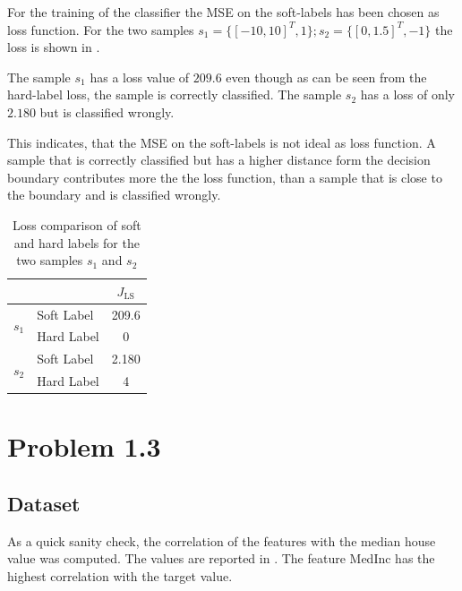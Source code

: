 \documentclass[12pt,a4paper]{scrartcl}
\begin{document}
	For the training of the classifier the MSE on the soft-labels has been chosen as loss function.
	For the two samples
	$s_1=\{[-10,10]^T, 1\}; s_2=\{[0, 1.5]^T, -1\}$ the loss is shown in . 
	
	The sample $s_1$ has a loss value of $209.6$ even though as can be seen from the hard-label loss, the sample is correctly classified.
	The sample $s_2$ has a loss of only $2.180$ but is classified wrongly. 
	
	
	This indicates, that the MSE on the soft-labels is not ideal as loss function. A sample that is correctly classified but has a higher distance form the decision boundary contributes more the the loss function, than a sample that is close to the boundary and is classified wrongly.
	
	\begin{table}[H]
		\centering
		\begin{tabular}{ll|c|}
			\cline{3-3}
			&            & $J_\mathrm{LS}$ \\ \hline
			\multicolumn{1}{|l|}{\multirow{2}{*}{$s_1$}} & Soft Label & 209.6           \\ \cline{2-3} 
			\multicolumn{1}{|l|}{}                       & Hard Label & 0               \\ \hline
			\multicolumn{1}{|l|}{\multirow{2}{*}{$s_2$}} & Soft Label & 2.180           \\ \cline{2-3} 
			\multicolumn{1}{|l|}{}                       & Hard Label & 4               \\ \hline
		\end{tabular}
		\caption{Loss comparison of soft and hard labels for the two samples $s_1$ and $s_2$}
		\label{tab:ex1_2_losses_blob}
	\end{table}

	\section*{Problem 1.3}
	\subsection*{Dataset}
	
	As a quick sanity check, the correlation of the features with the median house value was computed. The values are reported in . The feature MedInc has the highest correlation with the target value.	
	
\end{document}
